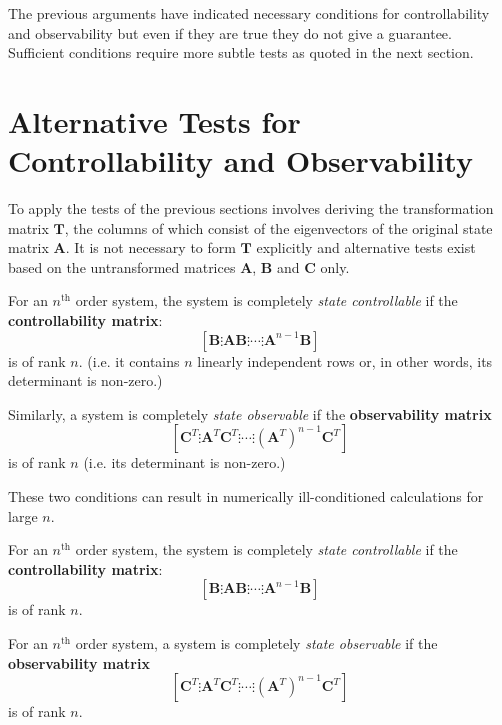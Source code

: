 The previous arguments have indicated necessary conditions for controllability and observability but even if they are true they do not give a guarantee. Sufficient conditions require more subtle tests as quoted in the next section.



\section*{Alternative Tests for Controllability and Observability} %
\label{sec:alternative_tests_for_controllability_and_observability}

To apply the tests of the previous sections involves deriving the transformation matrix $\mathbf{T}$, the columns of which consist of the eigenvectors of the original state matrix $\mathbf{A}$. It is not necessary to form $\mathbf{T}$ explicitly and alternative tests exist based on the untransformed matrices $\mathbf{A}$, $\mathbf{B}$ and $\mathbf{C}$ only.

For an $n^{\mathrm{th}}$ order system, the system is completely \emph{state controllable} if the \textbf{controllability matrix}:
\[
\left[\mathbf{B}\vdots\mathbf{AB}\vdots\cdots\vdots\mathbf{A}^{n-1}\mathbf{B}\right]
\]
is of rank $n$. (i.e. it contains $n$ linearly independent rows or, in other words, its determinant is non-zero.)

Similarly, a system is completely \emph{state observable} if the \textbf{observability matrix}
\[
\left[\mathbf{C}^T\vdots\mathbf{A}^T\mathbf{C}^T\vdots\cdots\vdots\left(\mathbf{A}^T\right)^{n-1}\mathbf{C}^T\right]
\]
is of rank $n$ (i.e. its determinant is non-zero.)

These two conditions can result in numerically ill-conditioned calculations for large $n$.

\ifslidesonly
\begin{slide}
   For an $n^{\mathrm{th}}$ order system, the system is completely \emph{state controllable} if the \textbf{controllability matrix}:
\[
\left[\mathbf{B}\vdots\mathbf{AB}\vdots\cdots\vdots\mathbf{A}^{n-1}\mathbf{B}\right]
\]
is of rank $n$.
\end{slide}

\begin{slide}
For an $n^{\mathrm{th}}$ order system, a system is completely \emph{state observable} if the \textbf{observability matrix}
\[
\left[\mathbf{C}^T\vdots\mathbf{A}^T\mathbf{C}^T\vdots\cdots\vdots\left(\mathbf{A}^T\right)^{n-1}\mathbf{C}^T\right]
\]
is of rank $n$.
\end{slide}
\fi


